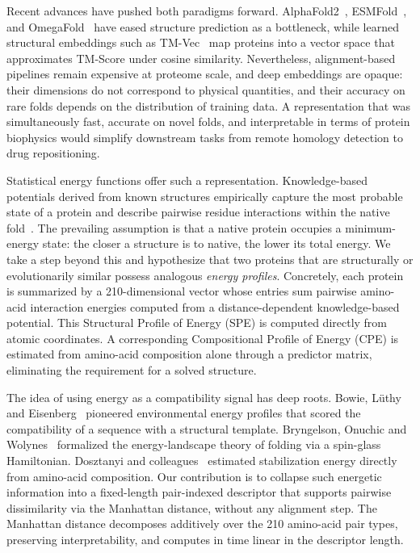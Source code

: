 \documentclass[11pt]{article}
\begin{document}
Recent advances have pushed both paradigms forward. AlphaFold2~\citep{jumper2021alphafold},
ESMFold~\citep{lin2023esmfold}, and OmegaFold~\citep{wu2022omegafold} have
eased structure prediction as a bottleneck, while learned structural embeddings
such as TM-Vec~\citep{hamamsy2024tmvec} map proteins into a vector space that
approximates TM-Score under cosine similarity. Nevertheless, alignment-based
pipelines remain expensive at proteome scale, and deep embeddings are opaque:
their dimensions do not correspond to physical quantities, and their accuracy on
rare folds depends on the distribution of training data. A representation that
was simultaneously fast, accurate on novel folds, and interpretable in terms of
protein biophysics would simplify downstream tasks from remote homology detection
to drug repositioning.

Statistical energy functions offer such a representation. Knowledge-based
potentials derived from known structures empirically capture the most probable
state of a protein and describe pairwise residue interactions within the
native fold~\citep{koppensteiner1998knowledge,sippl1990potential}. The
prevailing assumption is that a native protein occupies a minimum-energy
state: the closer a structure is to native, the lower its total energy. We
take a step beyond this and hypothesize that two proteins that are structurally
or evolutionarily similar possess analogous \emph{energy profiles}. Concretely,
each protein is summarized by a 210-dimensional vector whose entries sum
pairwise amino-acid interaction energies computed from a distance-dependent
knowledge-based potential. This Structural Profile of Energy (SPE) is computed
directly from atomic coordinates. A corresponding Compositional Profile of
Energy (CPE) is estimated from amino-acid composition alone through a
predictor matrix, eliminating the requirement for a solved structure.

The idea of using energy as a compatibility signal has deep roots. Bowie,
L\"uthy and Eisenberg~\citep{bowie1991eisenberg} pioneered environmental
energy profiles that scored the compatibility of a sequence with a structural
template. Bryngelson, Onuchic and Wolynes~\citep{bryngelson1995wolynes}
formalized the energy-landscape theory of folding via a spin-glass Hamiltonian.
Dosztanyi and colleagues~\citep{dosztanyi2008energy} estimated stabilization
energy directly from amino-acid composition. Our contribution is to collapse
such energetic information into a fixed-length pair-indexed descriptor that
supports pairwise dissimilarity via the Manhattan distance, without any
alignment step. The Manhattan distance decomposes additively over the 210
amino-acid pair types, preserving interpretability, and computes in time
linear in the descriptor length.
\end{document}
